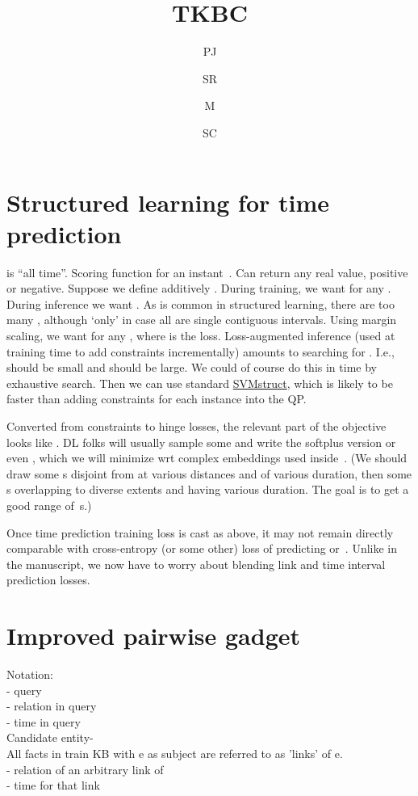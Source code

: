 \documentclass[12pt,a4paper]{article}
\begin{document}
\title{TKBC}
\author{PJ \and SR \and M \and SC}
\date{}
\maketitle


\section{Structured learning for time prediction}

 is ``all time''.
Scoring function  for an instant~.
Can return any real value, positive or negative.
Suppose we define additively .
During training, we want  for any .
During inference we want .
As is common in structured learning, there are too many , although `only'  in case all  are single contiguous intervals.
Using margin scaling, we want 
 for any , where  is the  loss.
Loss-augmented inference (used at training time to add constraints incrementally) amounts to searching for .
I.e.,   should be small and  should be large.
We could of course do this in  time by exhaustive search. 
Then we can use standard \href{https://www.cs.cornell.edu/people/tj/svm_light/svm_struct.html}{SVMstruct}, which is likely to be faster than adding  constraints for each instance into the QP.

Converted from constraints to hinge losses, the relevant part of the objective looks like
.  DL folks will usually sample some  and write the softplus version
 or even , which we will minimize wrt complex embeddings used inside~.
(We should draw some s disjoint from  at various distances and of various duration, then some s overlapping  to diverse extents and having various duration.  The goal is to get a good range of~s.)

Once time prediction training loss is cast as above, it may not remain directly comparable with cross-entropy (or some other) loss of predicting  or~.  Unlike in the manuscript, we now have to worry about blending link and time interval prediction losses.

\section{Improved pairwise gadget}
Notation:\\
 - query\\
 - relation in query\\
 - time in query \\
Candidate entity-  \\
All facts in train KB with e as subject are referred to as 'links' of e.\\
 - relation of an arbitrary link of \\
 - time for that link\\
\end{document}
